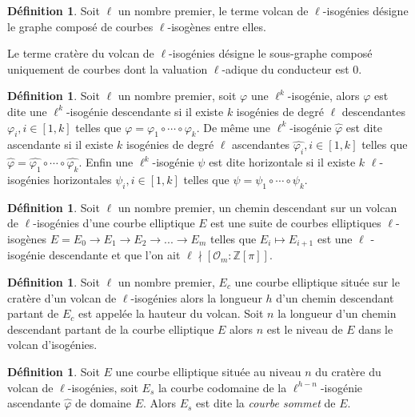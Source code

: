 \documentclass[10pt,a4paper]{book}
\theoremstyle{plain}
\theoremstyle{definition}
\theoremstyle{definition}
\theoremstyle{definition}
\theoremstyle{definition}
\newtheorem{defi}[thm]{Définition}
\theoremstyle{remark}
\theoremstyle{remark}
\theoremstyle{definition}
\begin{document}
\begin{defi}
Soit $\ell$ un nombre premier, le terme volcan de $\ell$-isogénies désigne le graphe composé de courbes $\ell$-isogènes entre elles.

Le terme cratère du volcan de $\ell$-isogénies désigne le sous-graphe composé uniquement de courbes dont la valuation $\ell$-adique du conducteur est $0$.
\end{defi}

\begin{defi}
Soit $\ell$ un nombre premier, soit $\varphi$ une $\ell^k$-isogénie, alors
$\varphi$ est dite une $\ell^k$-isogénie descendante si il existe $k$ 
isogénies de degré $\ell$ descendantes $\varphi_i, i \in [1,k]$ telles que 
$\varphi=\varphi_1 \circ \cdots \circ \varphi_k$. De même une 
$\ell^k$-isogénie $\widehat{\varphi}$ est dite ascendante si il existe $k$ 
isogénies de degré $\ell$ ascendantes $\widehat{\varphi_i}, i \in [1,k]$ 
telles que $\widehat{\varphi}=\widehat{\varphi_1} \circ \cdots \circ 
\widehat{\varphi_k}$. Enfin une $\ell^k$-isogénie $\psi$ est dite horizontale 
si il existe $k$ $\ell$-isogénies horizontales $\psi_i, i \in [1,k]$ telles 
que $\psi=\psi_1 \circ \cdots \circ \psi_k$.
\end{defi}

\begin{defi}
Soit $\ell$ un nombre premier, un chemin descendant sur un volcan de $\ell$-isogénies d'une courbe elliptique $E$ est une suite de courbes elliptiques $\ell$-isogènes $E=E_0 \rightarrow E_1 \rightarrow E_2 \rightarrow ... \rightarrow E_m$ telles que $E_i \mapsto E_{i+1}$ est une $\ell$ -isogénie descendante et que l'on ait $\ell \nmid [ \mathcal{O}_m : \mathbb{Z}[\pi]]$. 
\end{defi}

\begin{defi}
Soit $\ell$ un nombre premier, $E_c$ une courbe elliptique située sur le cratère d'un volcan de $\ell$-isogénies alors la longueur $h$ d'un chemin descendant partant de $E_c$ est appelée la hauteur du volcan.
Soit $n$ la longueur d'un chemin descendant partant de la courbe elliptique $E$ alors $n$ est le niveau de $E$ dans le volcan d'isogénies.
\end{defi}

\begin{defi}
\label{def:cou:som}
Soit $E$ une courbe elliptique située au niveau $n$ du cratère du volcan de $\ell$-isogénies, soit $E_s$ la courbe codomaine de la $\ell^{h-n}$-isogénie ascendante $\widehat{\varphi}$ de domaine $E$. Alors $E_s$ est dite la \emph{courbe sommet} de $E$. 
\end{defi}
\end{document}
